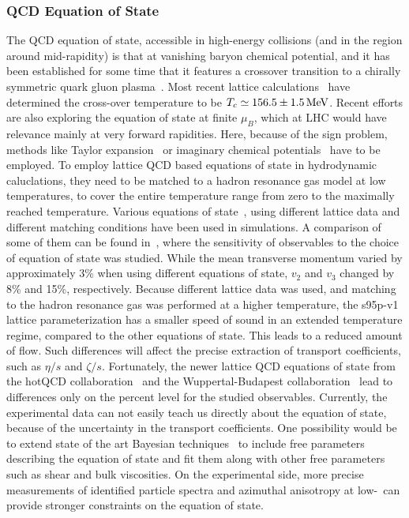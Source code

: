 \subsubsection{QCD Equation of State}
The QCD equation of state, accessible in high-energy collisions (and in 
  the region around mid-rapidity) is that at vanishing baryon chemical 
  potential, and it has been established for some time that it features 
  a crossover transition to a chirally symmetric quark gluon plasma~\cite{Aoki:2006we}. 
Most recent lattice calculations~\cite{Steinbrecher:2018phh} have determined 
  the cross-over temperature to be $T_c\simeq 156.5 \pm 1.5\,{\rm MeV}$. 
Recent efforts are also exploring the equation of state at finite $\mu_B$, 
  which at LHC would have relevance mainly at very forward rapidities. 
Here, because of the sign problem, methods like Taylor expansion~\cite{Kaczmarek:2011zz,Endrodi:2011gv,Bazavov:2015zja,Bonati:2018nut} 
  or imaginary chemical potentials~\cite{Cea:2014xva,Bonati:2014kpa,Bonati:2015bha,Bellwied:2015rza,Cea:2015cya} 
  have to be employed. 
To employ lattice QCD based equations of state in hydrodynamic caluclations, 
  they need to be matched to a hadron resonance gas model at low temperatures, 
  to cover the entire temperature range from zero to the maximally 
  reached temperature. 
Various equations of state~\cite{Huovinen:2009yb, Borsanyi:2013bia, Bazavov:2014pvz}, 
  using different lattice data and different matching conditions have been used 
  in simulations. 
A comparison of some of them can be found in~\cite{Moreland:2015dvc}, where 
  the sensitivity of observables to the choice of equation of state 
  was studied. 
While the mean transverse momentum varied by approximately 3\% when using 
  different equations of state, $v_2$ and $v_3$ changed by 8\% and 15\%, 
  respectively.
Because different lattice data was used, and matching to the hadron resonance 
  gas was performed at a higher temperature, the s95p-v1 lattice 
  parameterization has a smaller speed of sound in an extended temperature 
  regime, compared to the other equations of state. 
This leads to a reduced amount of flow. 
Such differences will affect the precise extraction of transport coefficients, 
  such as $\eta/s$ and $\zeta/s$. 
Fortunately, the newer lattice QCD equations of state from the hotQCD 
  collaboration~\cite{Bazavov:2014pvz} and the Wuppertal-Budapest 
  collaboration~\cite{Borsanyi:2013bia} lead to differences only on the 
  percent level for the studied observables.
Currently, the experimental data can not easily teach us directly about 
  the equation of state, because of the uncertainty in the transport 
  coefficients. 
One possibility would be to extend state of the art Bayesian techniques~\cite{Moreland:2018gsh} 
  to include free parameters describing the equation of state and fit them 
  along with other free parameters such as shear and bulk viscosities. 
On the experimental side, more precise measurements of identified particle 
  spectra and azimuthal anisotropy at low-\pt\ can provide stronger
  constraints on the equation of state.


